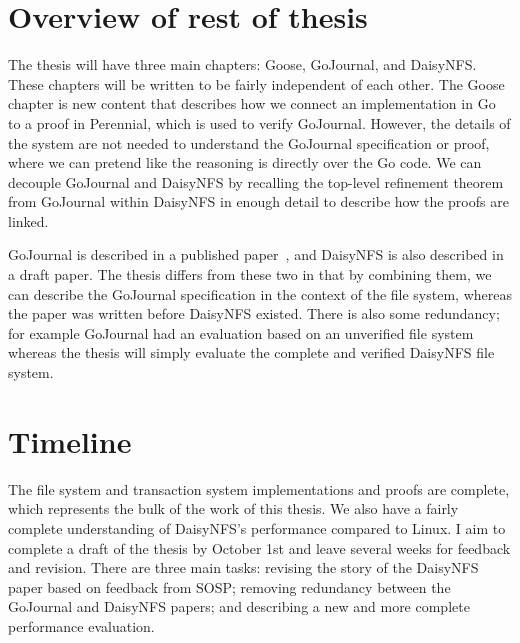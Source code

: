 \section{Overview of rest of thesis}
The thesis will have three main chapters: Goose, GoJournal, and DaisyNFS.\@
These chapters will be written to be fairly independent of each other. The Goose
chapter is new content that describes how we connect an implementation in Go to
a proof in Perennial, which is used to verify GoJournal. However, the details of
the system are not needed to understand the GoJournal specification or proof,
where we can pretend like the reasoning is directly over the Go code. We can
decouple GoJournal and DaisyNFS by recalling the top-level refinement theorem
from GoJournal within DaisyNFS in enough detail to describe how the proofs are
linked.

GoJournal is described in a published paper~\cite{chajed:gojournal}, and
DaisyNFS is also described in a draft paper. The thesis differs from these two
in that by combining them, we can describe the GoJournal specification in the
context of the file system, whereas the paper was written before DaisyNFS
existed. There is also some redundancy; for example GoJournal had an evaluation
based on an unverified file system whereas the thesis will simply evaluate the
complete and verified DaisyNFS file system.

\section{Timeline}
The file system and transaction system implementations and proofs are complete,
which represents the bulk of the work of this thesis. We also have a fairly
complete understanding of DaisyNFS's performance compared to Linux. I aim to
complete a draft of the thesis by October 1st and leave several weeks for
feedback and revision. There are three main tasks: revising the story of the
DaisyNFS paper based on feedback from SOSP; removing redundancy between the
GoJournal and DaisyNFS papers; and describing a new and more complete
performance evaluation.
